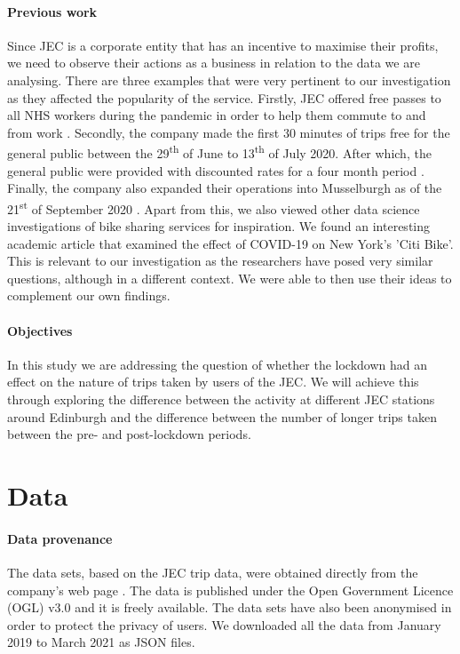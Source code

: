 \documentclass[11pt,a4paper]{article}
\begin{document}
\paragraph{Previous work}Since JEC is a corporate entity that has an incentive to maximise their profits, we need to observe their actions as a business in relation to the data we are analysing. There are three examples that were very pertinent to our investigation as they affected the popularity of the service. Firstly, JEC offered free passes to all NHS workers during the pandemic in order to help them commute to and from work \cite{Stephen2}. Secondly, the company made the first 30 minutes of trips free for the general public between the 29\textsuperscript{th} of June to 13\textsuperscript{th} of July 2020. After which, the general public were provided with discounted rates for a four month period \cite{Stephen1}. Finally, the company also expanded their operations into Musselburgh as of the 21\textsuperscript{st} of September 2020 \cite{Dalton1}. Apart from this, we also viewed other data science investigations of bike sharing services for inspiration. We found an interesting academic article that examined the effect of COVID-19 on New York's 'Citi Bike'\cite{citiBike}. This is relevant to our investigation as the researchers have posed very similar questions, although in a different context. We were able to then use their ideas to complement our own findings.  

\paragraph{Objectives} In this study we are addressing the question of whether the lockdown had an effect on the nature of trips taken by users of the JEC. We will achieve this through exploring the difference between the activity at different JEC stations around Edinburgh and the difference between the number of longer trips taken between the pre- and post-lockdown periods.  

\section{Data}
\paragraph{Data provenance}
The data sets, based on the JEC trip data, were obtained directly from the company's web page \cite{historicalData}. The data is published under the Open Government Licence (OGL) v3.0 and it is freely available. The data sets have also been anonymised in order to protect the privacy of users. We downloaded all the data from January 2019 to March 2021 as JSON files. 
\end{document}
